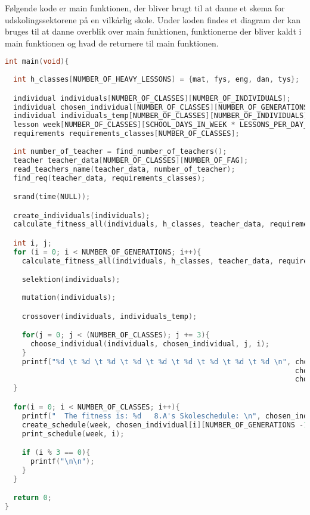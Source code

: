 Følgende kode er main funktionen, der bliver brugt til at danne et skema for udskolingssektorene på en vilkårlig skole. Under koden findes et diagram der kan bruges til at danne overblik over main funktionen, funktionerne der bliver kaldt i main funktionen og hvad de returnere til main funktionen. 
\begin{lstlisting}[language = c]
int main(void){
  
  int h_classes[NUMBER_OF_HEAVY_LESSONS] = {mat, fys, eng, dan, tys};

  individual individuals[NUMBER_OF_CLASSES][NUMBER_OF_INDIVIDUALS];
  individual chosen_individual[NUMBER_OF_CLASSES][NUMBER_OF_GENERATIONS];
  individual individuals_temp[NUMBER_OF_CLASSES][NUMBER_OF_INDIVIDUALS];
  lesson week[NUMBER_OF_CLASSES][SCHOOL_DAYS_IN_WEEK * LESSONS_PER_DAY_MAX];
  requirements requirements_classes[NUMBER_OF_CLASSES];
  
  int number_of_teacher = find_number_of_teachers();
  teacher teacher_data[NUMBER_OF_CLASSES][NUMBER_OF_FAG];
  read_teachers_name(teacher_data, number_of_teacher);
  find_req(teacher_data, requirements_classes);

  srand(time(NULL));

  create_individuals(individuals);
  calculate_fitness_all(individuals, h_classes, teacher_data, requirements_classes);

  int i, j;
  for (i = 0; i < NUMBER_OF_GENERATIONS; i++){
    calculate_fitness_all(individuals, h_classes, teacher_data, requirements_classes);

    selektion(individuals);
    
    mutation(individuals);

    crossover(individuals, individuals_temp);

    for(j = 0; j < (NUMBER_OF_CLASSES); j += 3){
      choose_individual(individuals, chosen_individual, j, i);  
    }
    printf("%d \t %d \t %d \t %d \t %d \t %d \t %d \t %d \t %d \n", chosen_individual[0][i].fitness, chosen_individual[1][i].fitness, chosen_individual[2][i].fitness, 
                                                                    chosen_individual[3][i].fitness, chosen_individual[4][i].fitness, chosen_individual[5][i].fitness, 
                                                                    chosen_individual[6][i].fitness, chosen_individual[7][i].fitness, chosen_individual[8][i].fitness);
  }

  for(i = 0; i < NUMBER_OF_CLASSES; i++){
    printf("  The fitness is: %d   8.A's Skoleschedule: \n", chosen_individual[i][NUMBER_OF_GENERATIONS -1].fitness);
    create_schedule(week, chosen_individual[i][NUMBER_OF_GENERATIONS -1], i);
    print_schedule(week, i);

    if (i % 3 == 0){
      printf("\n\n");
    }
  }

  return 0;
}
\end{lstlisting}
